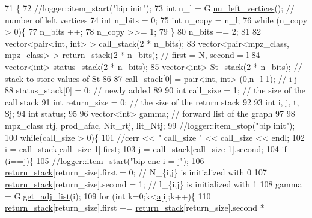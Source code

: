\begin{DoxyCode}
71                                                                          \{
72   \textcolor{comment}{//logger::item\_start("bip init");}
73   \textcolor{keywordtype}{int} n\_l = G.\hyperlink{classb__graph_a5e71d5c97f2501b0b93c17146cf7e68e}{nu\_left\_vertices}(); \textcolor{comment}{// number of left vertices}
74   \textcolor{keywordtype}{int} n\_bits = 0;
75   \textcolor{keywordtype}{int} n\_copy = n\_l;
76   \textcolor{keywordflow}{while} (n\_copy > 0)\{
77     n\_bits ++;
78     n\_copy >>= 1;
79   \}
80   n\_bits += 2;
81 
82   vector<pair<int, int> > call\_stack(2 * n\_bits);
83   vector<pair<mpz\_class, mpz\_class> > \hyperlink{namespacehelper__vars_a6d2100c373830cacd232319a9958652d}{return\_stack}(2 * n\_bits); \textcolor{comment}{// first = N, second = l}
84   vector<int> status\_stack(2 * n\_bits);
85   vector<int> St\_stack(2 * n\_bits); \textcolor{comment}{// stack to store values of St}
86  
87   call\_stack[0] = pair<int, int> (0,n\_l-1); \textcolor{comment}{// i j }
88   status\_stack[0] = 0; \textcolor{comment}{// newly added}
89  
90   \textcolor{keywordtype}{int} call\_size = 1; \textcolor{comment}{// the size of the call stack}
91   \textcolor{keywordtype}{int} return\_size = 0; \textcolor{comment}{// the size of the return stack}
92 
93   \textcolor{keywordtype}{int} i, j, t, Sj;
94   \textcolor{keywordtype}{int} status;
95  
96   vector<int> gamma; \textcolor{comment}{// forward list  of the graph}
97 
98   mpz\_class rtj, prod\_afac, Nit\_rtj, lit\_Ntj;
99   \textcolor{comment}{//logger::item\_stop("bip init");}
100   \textcolor{keywordflow}{while}(call\_size > 0)\{
101     \textcolor{comment}{//cerr << " call\_size " << call\_size << endl;}
102     i = call\_stack[call\_size-1].first;
103     j = call\_stack[call\_size-1].second;
104     \textcolor{keywordflow}{if} (i==j)\{
105       \textcolor{comment}{//logger::item\_start("bip enc i = j");}
106       \hyperlink{namespacehelper__vars_a6d2100c373830cacd232319a9958652d}{return\_stack}[return\_size].first = 0; \textcolor{comment}{// N\_\{i,j\} is initialized with 0}
107       \hyperlink{namespacehelper__vars_a6d2100c373830cacd232319a9958652d}{return\_stack}[return\_size].second = 1; \textcolor{comment}{// l\_\{i,j\} is initialized with 1}
108       gamma = G.\hyperlink{classb__graph_aa81c7179b9c6cb4986c4b41e84a85799}{get\_adj\_list}(i);
109       \textcolor{keywordflow}{for} (\textcolor{keywordtype}{int} k=0;k<\hyperlink{classb__graph__encoder_afd22d167f495cd85b41397f337c377c2}{a}[i];k++)\{
110         \hyperlink{namespacehelper__vars_a6d2100c373830cacd232319a9958652d}{return\_stack}[return\_size].first += \hyperlink{namespacehelper__vars_a6d2100c373830cacd232319a9958652d}{return\_stack}[return\_size].second * 

\end{DoxyCode}
